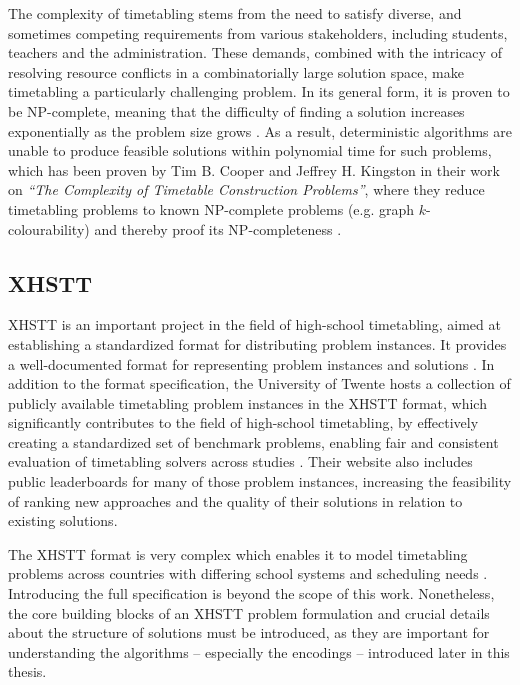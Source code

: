 \documentclass[english,examples]{isasthesis}
\begin{document}
The complexity of timetabling stems from the need to satisfy diverse, and
sometimes competing requirements from various stakeholders, including students,
teachers and the administration.
%
These demands, combined with the intricacy of resolving resource conflicts in a
combinatorially large solution space, make timetabling a particularly
challenging problem.
In its general form, it is proven to be NP-complete, meaning that the
difficulty of finding a solution increases exponentially as the problem size
grows \cite{Beligiannis2009}.
As a result, deterministic algorithms are unable to produce feasible solutions
within polynomial time for such problems, which has been proven by
Tim B. Cooper and Jeffrey H. Kingston in their work on
\textit{\enquote{The Complexity of Timetable Construction Problems}}, where
they reduce timetabling problems to known NP-complete problems
(e.g. graph $k$-colourability) and thereby proof its NP-completeness
\cite{cooper1996complexity,Beligiannis2008}.

\subsection{XHSTT}
XHSTT is an important project in the field of high-school timetabling, aimed
at establishing a standardized format for distributing problem instances.
It provides a well-documented format for representing problem instances and
solutions \cite{Post2014}.
In addition to the format specification, the University of Twente hosts a
collection of publicly available timetabling problem instances in the XHSTT
format, which significantly contributes to the field of high-school timetabling,
by effectively creating a standardized set of benchmark problems, enabling
fair and consistent evaluation of timetabling solvers across studies
\cite{xhsttTwenteWeb}.
Their website also includes public leaderboards for many of those problem
instances, increasing the feasibility of ranking new approaches and the
quality of their solutions in relation to existing solutions.

The XHSTT format is very complex which enables it to model timetabling problems
across countries with differing school systems and scheduling needs
\cite{Post2014,xhsttDocs}.
Introducing the full specification is beyond the scope of this work.
Nonetheless, the core building blocks of an XHSTT problem formulation and
crucial details about the structure of solutions must be introduced, as they
are important for understanding the algorithms -- especially the encodings --
introduced later in this thesis.
\end{document}
